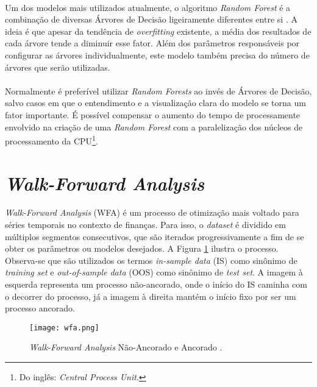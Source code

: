 \paragraph{} Um dos modelos mais utilizados atualmente, o algoritmo \textit{Random Forest} é a combinação de diversas Árvores de Decisão ligeiramente diferentes entre si \cite{muller2016introduction}. A ideia é que apesar da tendência de \textit{overfitting} existente, a média dos resultados de cada árvore tende a diminuir esse fator. Além dos parâmetros responsáveis por configurar as árvores individualmente, este modelo também precisa do número de árvores que serão utilizadas.

\paragraph{} Normalmente é preferível utilizar \textit{Random Forests} ao invés de Árvores de Decisão, salvo casos em que o entendimento e a visualização clara do modelo se torna um fator importante. É possível compensar o aumento do tempo de processamente envolvido na criação de uma \textit{Random Forest} com a paralelização dos núcleos de processamento da CPU\footnote{Do inglês: \textit{Central Process Unit}.}.



\FloatBarrier
\section{\textit{Walk-Forward Analysis}}

\paragraph{} \textit{Walk-Forward Analysis} (WFA) \cite{pardo2011evaluation} é um processo de otimização mais voltado para séries temporais no contexto de finanças. Para isso, o \textit{dataset} é dividido em múltiplos segmentos consecutivos, que são iterados progressivamente a fim de se obter os parâmetros ou modelos desejados. A Figura \ref{fig:10} ilustra o processo. Observa-se que são utilizados os termos \textit{in-sample data} (IS) como sinônimo de \textit{training set} e \textit{out-of-sample data} (OOS) como sinônimo de \textit{test set}. A imagem à esquerda representa um processo não-ancorado, onde o início do IS caminha com o decorrer do processo, já a imagem à direita mantém o início fixo por ser um processo ancorado.

\begin{figure}[!htb]
    \texttt{[image: wfa.png]}
    \centering
    \caption{\textit{Walk-Forward Analysis} Não-Ancorado e Ancorado \cite{wfo}.}
    \label{fig:10}
\end{figure}

